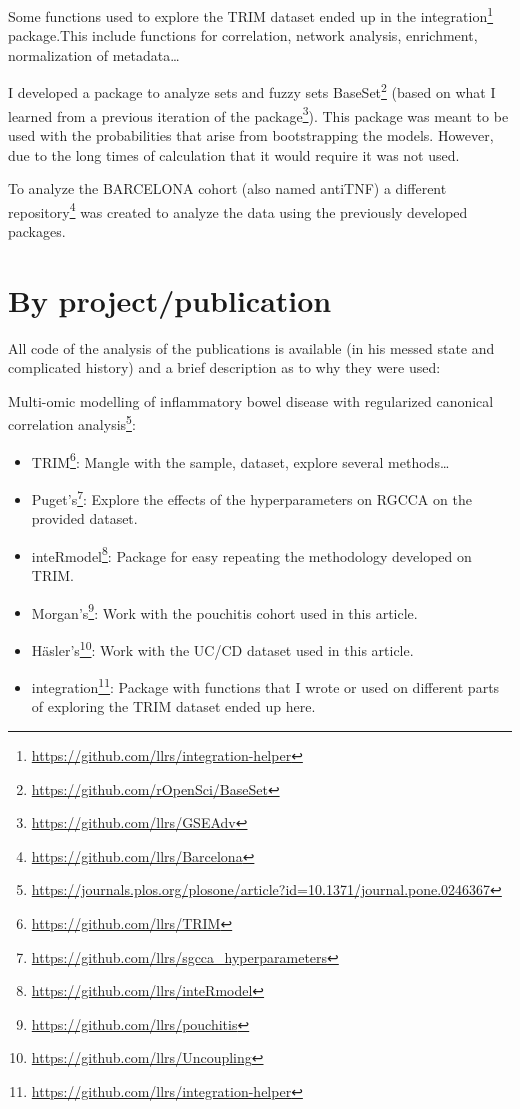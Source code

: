 \documentclass[
  12pt,
  a4paper,
  twoside,
  openright]{book}
\DeclareRobustCommand{\href}[2]{#2\footnote{\url{#1}}}
\providecommand{\tightlist}{%
  \setlength{\itemsep}{0pt}\setlength{\parskip}{0pt}}
\begin{document}
Some functions used to explore the TRIM dataset ended up in the \href{https://github.com/llrs/integration-helper}{integration} package.This include functions for correlation, network analysis, enrichment, normalization of metadata\ldots{}

I developed a package to analyze sets and fuzzy sets \href{https://github.com/rOpenSci/BaseSet}{BaseSet} (based on what I learned from a previous iteration of the \href{https://github.com/llrs/GSEAdv}{package}).
This package was meant to be used with the probabilities that arise from bootstrapping the models.
However, due to the long times of calculation that it would require it was not used.

To analyze the BARCELONA cohort (also named antiTNF) a \href{https://github.com/llrs/Barcelona}{different repository} was created to analyze the data using the previously developed packages.

\hypertarget{by-projectpublication}{%
\section{By project/publication}\label{by-projectpublication}}

All code of the analysis of the publications is available (in his messed state and complicated history) and a brief description as to why they were used:

\href{https://journals.plos.org/plosone/article?id=10.1371/journal.pone.0246367}{Multi-omic modelling of inflammatory bowel disease with regularized canonical correlation analysis}:

\begin{itemize}
\tightlist
\item
  \href{https://github.com/llrs/TRIM}{TRIM}: Mangle with the sample, dataset, explore several methods\ldots{}
\item
  \href{https://github.com/llrs/sgcca_hyperparameters}{Puget's}: Explore the effects of the hyperparameters on RGCCA on the provided dataset.
\item
  \href{https://github.com/llrs/inteRmodel}{inteRmodel}: Package for easy repeating the methodology developed on TRIM.
\item
  \href{https://github.com/llrs/pouchitis}{Morgan's}: Work with the pouchitis cohort used in this article.
\item
  \href{https://github.com/llrs/Uncoupling}{Häsler's}: Work with the UC/CD dataset used in this article.
\item
  \href{https://github.com/llrs/integration-helper}{integration}: Package with functions that I wrote or used on different parts of exploring the TRIM dataset ended up here.
\end{itemize}
\end{document}
